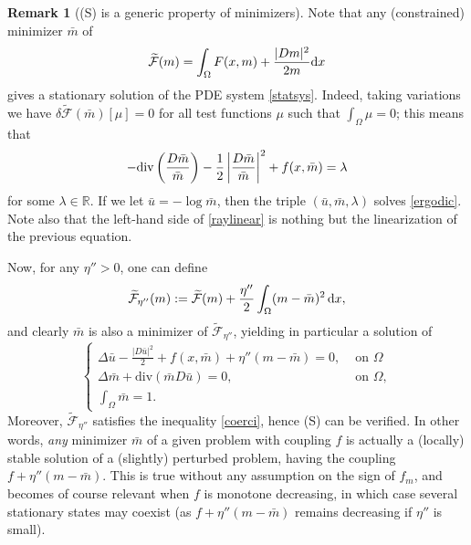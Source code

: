 \documentclass[10pt,a4paper,nouppercase,nowrite]{article}
\numberwithin{equation}{section}
\newcommand{\di}{{\rm d}}
\newcommand{\Sp}{{\textsc (S)} }
\newcommand{\F}{\widetilde{\mathcal{F}}}
\newcommand{\R}{\mathbb{R}}
\theoremstyle{definition}
\newtheorem{rmk}[defn]{Remark}
\begin{document}
\begin{rmk}[\Sp is a generic property of minimizers]\label{generic}
Note that any (constrained) minimizer $\bar m$ of
\[
	\widetilde{\mathcal{F}}(m)=\int_{\Omega} F(x,m) + \frac{|Dm|^2}{2m} \di x
\]
gives a stationary solution of the PDE system \eqref{statsys}. Indeed, taking variations we have $\delta\F(\bar m)[\mu] = 0$ for all test functions $\mu$ such that $\int_{\Omega} \mu = 0$; this means that
\[
-{\rm div}\left(\frac{D \bar m}{\bar m}\right) - \frac12\left|\frac{D \bar m}{\bar m}\right|^2 + f(x, \bar m) = \lambda
\]
for some $\lambda\in \R$. If we let $\bar u = -\log \bar m$, then the triple $(\bar u, \bar m, \lambda)$ solves \eqref{ergodic}. Note also that the left-hand side of \eqref{raylinear} is nothing but the linearization of the previous equation.

Now, for any $\eta'' > 0$, one can define
\[
\widetilde{\mathcal{F}}_{\eta''}(m):=\widetilde{\mathcal{F}}(m) + \frac{\eta''}{2} \int_{\Omega} (m-\bar{m})^2 \, \di x,
\]
and clearly $\bar m$ is also a minimizer of $\widetilde{\mathcal{F}}_{\eta''}$, yielding in particular a solution of
\[
\begin{cases}
	\Delta \bar{u} - \frac{|D\bar{u}|^2}{2} + f(x,\bar{m}) + \eta''(m - \bar m) = 0,& \text{ on }  \Omega \\
	\Delta \bar{m} + \text{div}(\bar{m} D\bar{u})=0,& \text{ on }  \Omega, \\
	\int_{\Omega} \bar m = 1.
\end{cases}
\]
Moreover, $\widetilde{\mathcal{F}}_{\eta''}$ satisfies the inequality \eqref{coerci}, hence \Sp can be verified. In other words, \textit{any} minimizer $\bar m$ of a given problem with coupling $f$ is actually a (locally) stable solution of a (slightly) perturbed problem, having the coupling $f + \eta''(m-\bar m)$. This is true without any assumption on the sign of $f_m$, and becomes of course relevant when $f$ is monotone decreasing, in which case several stationary states may coexist (as $f + \eta''(m-\bar m)$ remains decreasing if $\eta''$ is small).
\end{rmk}

\end{document}
